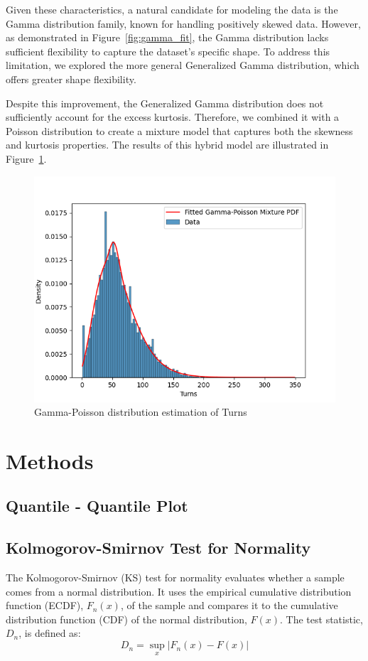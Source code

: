 \documentclass[conference]{IEEEtran}
\begin{document}
Given these characteristics, a natural candidate for modeling the data is the Gamma distribution family, known for handling positively skewed data. However, as demonstrated in Figure~\ref{fig:gamma_fit}, the Gamma distribution lacks sufficient flexibility to capture the dataset’s specific shape. To address this limitation, we explored the more general Generalized Gamma distribution, which offers greater shape flexibility.

Despite this improvement, the Generalized Gamma distribution does not sufficiently account for the excess kurtosis. Therefore, we combined it with a Poisson distribution to create a mixture model that captures both the skewness and kurtosis properties. The results of this hybrid model are illustrated in Figure~\ref{fig:gam_poi_fit}.



\begin{figure}[H]
    \centering
    \includegraphics[width=0.8\linewidth]{gamma_poisson_fit.png}
    \caption{Gamma-Poisson distribution estimation of Turns}
    \label{fig:gam_poi_fit}
\end{figure}

\section{Methods}
\subsection{Quantile - Quantile Plot}

\subsection{Kolmogorov-Smirnov Test for Normality}
The Kolmogorov-Smirnov (KS) test for normality evaluates whether a sample comes from a normal distribution. It uses the empirical cumulative distribution function (ECDF), $F_n(x)$, of the sample and compares it to the cumulative distribution function (CDF) of the normal distribution, $F(x)$. The test statistic, $D_n$, is defined as:
\[D_n = \sup_x |F_n(x) - F(x)|\]
\end{document}
